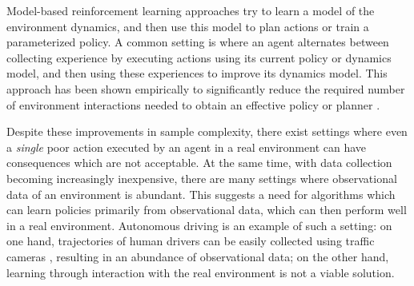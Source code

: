 \documentclass{article} %
\begin{document}
Model-based reinforcement learning approaches try to learn a model of the environment dynamics, and then use this model to plan actions or train a parameterized policy.
A common setting is where an agent alternates between collecting experience by executing actions using its current policy or dynamics model, and then using these experiences to improve its dynamics model.
This approach has been shown empirically to significantly reduce the required number of environment interactions needed to obtain an effective policy or planner \citep{Atkeson1997, PILCO, Nagabandi2017, Chua2018}.

Despite these improvements in sample complexity, there exist settings where even a \textit{single} poor action executed by an agent in a real environment can have consequences which are not acceptable.
At the same time, with data collection becoming increasingly inexpensive, there are many settings where observational data of an environment is abundant.
This suggests a need for algorithms which can learn policies primarily from observational data, which can then perform well in a real environment.
Autonomous driving is an example of such a setting: on one hand, trajectories of human drivers can be easily collected using traffic cameras \citep{NGSIM}, resulting in an abundance of observational data; on the other hand, learning through interaction with the real environment is not a viable solution.
\end{document}
